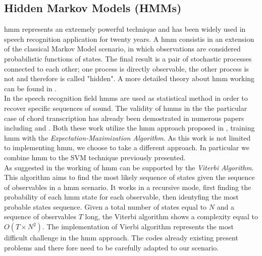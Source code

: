 \subsection{Hidden Markov Models (HMMs)}
\label{subsec:hmm}

\gls{hmm} represents an extremely powerful technique and has been widely used in speech recognition application for twenty years. A \gls{hmm} consistis in an extension of the classical Markov Model scenario, in which observations are considered probabilistic functions of states. The final result is a pair of stochastic processes connected to each other; one process is directly observable, the other process is not and therefore is called "hidden". A more detailed theory about \gls{hmm} working can be found in \cite{LawrenceHMMtutorial}. \\
%
In the speech recognition field \gls{hmm}s are used as statistical method in order to recover specific sequences of sound. The validity of \gls{hmm}s in the the particular case of chord transcription has already been demostrated in numerous papers including \cite{AlexDanEMplusHMM} and \cite{belpickMusic}. Both these work utilize the \gls{hmm} approach proposed in \cite{GoldMorganSpeechRecogn}, training \gls{hmm} with the \textit{Expectation-Maximization Algorithm}. As this work is not limited to implementing \gls{hmm}, we choose to take a different approach. In particular we combine \gls{hmm} to the SVM technique previously presented. \\
%
As suggested in \cite{GoldMorganSpeechRecogn} the working of \gls{hmm} can be supported by the \textit{Viterbi Algorithm}. This algorithm aims to find the most likely sequence of states given the sequence of observables in a \gls{hmm} scenario. It works in a recursive mode, first finding the probability of each \gls{hmm} state for each observable, then identyfing the most probable states sequence. Given a total number of states equal to $N$ and a sequence of observables $T$ long, the Viterbi algorithm shows a complexity equal to $O(T \times N^2)$. The implementation of Vierbi algorithm represents the most difficult challenge in the \gls{hmm} approach. The codes already existing present problems and there fore need to be carefully adapted to our scenario. 
